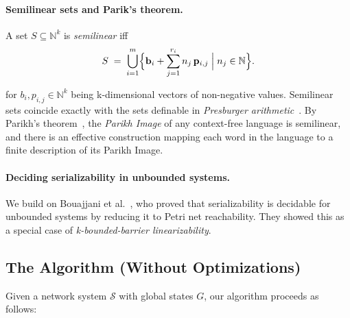 %

\paragraph{Semilinear sets and Parik’s theorem.}
A set \(S\subseteq\mathbb N^k\) is \emph{semilinear} iff
\[
S \;=\; \bigcup_{i=1}^m \Bigl\{\mathbf b_i + \sum_{j=1}^{r_i} n_j\,\mathbf p_{i,j}
\;\Big|\; n_j\in\mathbb N\Bigr\}.
\]

for $b_i, p_{i,j}\in \mathbb N^k$ being k-dimensional vectors of non-negative values.
%
Semilinear sets coincide exactly with the sets definable in \textit{Presburger arithmetic}~\cite{Pr29}.
%
By Parikh's theorem~\cite{Parikh66}, the \textit{Parikh Image} of any context-free language is semilinear, and there is an effective construction mapping each word in the language to a
finite description of its Parikh Image.

\paragraph{Deciding serializability in unbounded systems.}

We build on Bouajjani et al.~\cite{BoEmEnHa13}, who proved that serializability is decidable for unbounded systems by reducing it to Petri net reachability. They showed this as a special case of \textit{k-bounded-barrier linearizability}.



\subsection{The Algorithm (Without Optimizations)}

Given a network system \(\mathcal S\) with global states \(G\), our algorithm proceeds as follows:  

